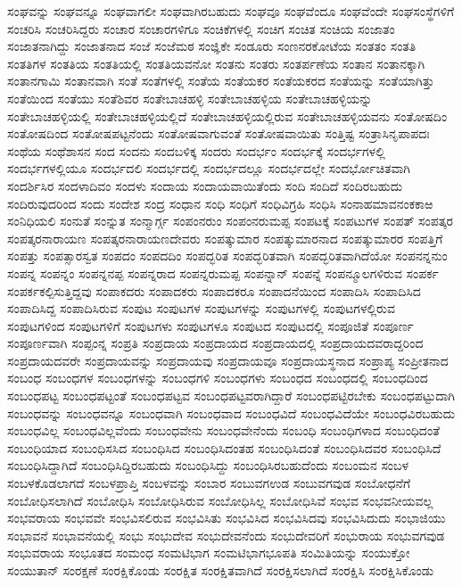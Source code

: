 {ಸಂಘವನ್ನು
ಸಂಘವನ್ನೂ
ಸಂಘವಾಗಲೀ
ಸಂಘವಾಗಿರಬಹುದು
ಸಂಘವೂ
ಸಂಘವೆಂದೂ
ಸಂಘವೆಂದೇ
ಸಂಘಸಂಸ್ಥೆಗಳಿಗೆ
ಸಂಚರಿಸಿ
ಸಂಚರಿಸಿದ್ದರು
ಸಂಚಾರ
ಸಂಚಾರಗಳಿಗೂ
ಸಂಚಿಕೆಗಳಲ್ಲಿ
ಸಂಚಿಗ
ಸಂಚಿತ
ಸಂಚಿಯ
ಸಂಜಾತಂ
ಸಂಜಾತನಾಗಿದ್ದು
ಸಂಜಾತನಾದ
ಸಂಜೆ
ಸಂಜೆಮಠ
ಸಂಜ್ಞಿಕೇ
ಸಂಡೂರು
ಸಂಣನರಕೋಟೆಯ
ಸಂತತಂ
ಸಂತತಿ
ಸಂತತಿಗಳ
ಸಂತತಿಯ
ಸಂತತಿಯಲ್ಲಿ
ಸಂತತಿಯವನೋ
ಸಂತನು
ಸಂತರು
ಸಂತರ್ಪಣೆಯ
ಸಂತಾನ
ಸಂತಾನಕ್ಕಾಗಿ
ಸಂತಾನಗಾಮಿ
ಸಂತಾನವಾಗಿ
ಸಂತೆ
ಸಂತೆಗಳಲ್ಲಿ
ಸಂತೆಯ
ಸಂತೆಯಕರ
ಸಂತೆಯಕರದ
ಸಂತೆಯನ್ನು
ಸಂತೆಯಾಗಿತ್ತು
ಸಂತೆಯಿಂದ
ಸಂತೆಯು
ಸಂತೆಶಿವರ
ಸಂತೇಬಾಚಹಳ್ಳಿ
ಸಂತೇಬಾಚಹಳ್ಳಿಯ
ಸಂತೇಬಾಚಹಳ್ಳಿಯನ್ನು
ಸಂತೇಬಾಚಹಳ್ಳಿಯಲ್ಲಿ
ಸಂತೇಬಾಚಹಳ್ಳಿಯಲ್ಲಿದೆ
ಸಂತೇಬಾಚಹಳ್ಳಿಯಲ್ಲಿರುವ
ಸಂತೇಬಾಚಹಳ್ಳಿಯವನು
ಸಂತೋಷದಿಂ
ಸಂತೋಷದಿಂದ
ಸಂತೋಷಪಟ್ಟನೆಂದು
ಸಂತೋಷವಾಗುವಂತೆ
ಸಂತೋಷವಾಯಿತು
ಸಂತ್ತಿಷ್ಟ
ಸಂತ್ರಾಸಿನೃಪಾಪದಃ
ಸಂಥೆಯ
ಸಂಥೆಶಾಸನ
ಸಂದ
ಸಂದನು
ಸಂದಬಳಿಕ್ಕ
ಸಂದರು
ಸಂದರ್ಭಂ
ಸಂದರ್ಭಕ್ಕೆ
ಸಂದರ್ಭಗಳಲ್ಲಿ
ಸಂದರ್ಭಗಳಲ್ಲಿಯೂ
ಸಂದರ್ಭದಲಿ
ಸಂದರ್ಭದಲ್ಲಿ
ಸಂದರ್ಭದಲ್ಲೂ
ಸಂದರ್ಭದಲ್ಲೇ
ಸಂದರ್ಭೋಚಿತವಾಗಿ
ಸಂದರ್ಶಿಸಿರ
ಸಂದಳಾದಿವಂ
ಸಂದಳು
ಸಂದಾಯ
ಸಂದಾಯವಾಯಿತೆಂದು
ಸಂದಿ
ಸಂದಿದೆ
ಸಂದಿರಬಹುದು
ಸಂದಿರುವುದರಿಂದ
ಸಂದು
ಸಂದೇಶ
ಸಂದ್ರ
ಸಂಧಾನ
ಸಂಧಿ
ಸಂಧಿಗೆ
ಸಂಧಿವಿಗ್ರಹಿ
ಸಂಧಿಸಿ
ಸಂನಾಹಮಾವನಂಕಕಾಱ
ಸಂನಿಧಿಯಲಿ
ಸಂನುತೆ
ಸಂನ್ನುತ
ಸಂನ್ಮಾರ್ಗ್ಗ
ಸಂಪಂನರುಂ
ಸಂಪಂನರುಮಪ್ಪ
ಸಂಪಟಕ್ಕೆ
ಸಂಪಟುಗಳ
ಸಂಪತ್
ಸಂಪತ್ಕರ
ಸಂಪತ್ಕರನಾರಾಯಣ
ಸಂಪತ್ಕರನಾರಾಯಣದೇವರು
ಸಂಪತ್ಕುಮಾರ
ಸಂಪತ್ಕುಮಾರನಾದ
ಸಂಪತ್ಕುಮಾರರ
ಸಂಪತ್ತಿಗೆ
ಸಂಪತ್ತು
ಸಂಪತ್ಸಾರಸ್ವತ
ಸಂಪದಂ
ಸಂಪದದಿಂ
ಸಂಪದ್ಭರಿತ
ಸಂಪದ್ಭರಿತವಾಗಿ
ಸಂಪದ್ಭರಿತವಾಗಿದೆಯೋ
ಸಂಪನನ್ನನುಂ
ಸಂಪನ್ನ
ಸಂಪನ್ನಂ
ಸಂಪನ್ನನಪ್ಪ
ಸಂಪನ್ನರಾದ
ಸಂಪನ್ನರುಮಪ್ಪ
ಸಂಪನ್ನಾನ್
ಸಂಪನ್ನೆ
ಸಂಪನ್ಮೂಲಗಳಿರುವ
ಸಂಪರ್ಕ
ಸಂಪರ್ಕಕಲ್ಪಿಸುತ್ತಿದ್ದವು
ಸಂಪಾಕದರು
ಸಂಪಾದಕರು
ಸಂಪಾದಕರೂ
ಸಂಪಾದನೆಯಿಂದ
ಸಂಪಾದಿಸಿ
ಸಂಪಾದಿಸಿದ
ಸಂಪಾದಿಸಿದ್ದ
ಸಂಪಾದಿಸಿರುವ
ಸಂಪುಟ
ಸಂಪುಟಗಳ
ಸಂಪುಟಗಳನ್ನು
ಸಂಪುಟಗಳಲ್ಲಿ
ಸಂಪುಟಗಳಲ್ಲಿರುವ
ಸಂಪುಟಗಳಿಂದ
ಸಂಪುಟಗಳಿಗೆ
ಸಂಪುಟಗಳು
ಸಂಪುಟಗಳೂ
ಸಂಪುಟದ
ಸಂಪುಟದಲ್ಲಿ
ಸಂಪೂಜಿತೆ
ಸಂಪೂರ್ಣ
ಸಂಪೂರ್ಣವಾಗಿ
ಸಂಪ್ಪಂನ್ನ
ಸಂಪ್ರತಿ
ಸಂಪ್ರದಾಯ
ಸಂಪ್ರದಾಯದ
ಸಂಪ್ರದಾಯದಲ್ಲಿ
ಸಂಪ್ರದಾಯದವರಾದ್ದರಿಂದ
ಸಂಪ್ರದಾಯದವರೇ
ಸಂಪ್ರದಾಯವನ್ನು
ಸಂಪ್ರದಾಯವು
ಸಂಪ್ರದಾಯವೂ
ಸಂಪ್ರದಾಯಸ್ಥನಾದ
ಸಂಪ್ರಾಪ್ಯ
ಸಂಪ್ರೀತನಾದ
ಸಂಬಂಧ
ಸಂಬಂಧಗಳ
ಸಂಬಂಧಗಳನ್ನು
ಸಂಬಂಧಗಳಿ
ಸಂಬಂಧಗಳು
ಸಂಬಂಧದ
ಸಂಬಂಧದಲ್ಲಿ
ಸಂಬಂಧದಿಂದ
ಸಂಬಂಧಪಟ್ಟ
ಸಂಬಂಧಪಟ್ಟಂತೆ
ಸಂಬಂಧಪಟ್ಟವ
ಸಂಬಂಧಪಟ್ಟವರಾಗಿದ್ದಾರೆ
ಸಂಬಂಧಪಟ್ಟಿರಬೇಕು
ಸಂಬಂಧಪಟ್ಟುದಾಗಿ
ಸಂಬಂಧವನ್ನು
ಸಂಬಂಧವನ್ನೂ
ಸಂಬಂಧವಾಗಿ
ಸಂಬಂಧವಾದ
ಸಂಬಂಧವಿದೆ
ಸಂಬಂಧವಿದೆಯೇ
ಸಂಬಂಧವಿರಬಹುದು
ಸಂಬಂಧವಿಲ್ಲ
ಸಂಬಂಧವಿಲ್ಲವೆಂದು
ಸಂಬಂಧವೇನು
ಸಂಬಂಧವೇನೆಂದು
ಸಂಬಂಧಿ
ಸಂಬಂಧಿಗಳಾದ
ಸಂಬಂಧಿದಂತೆ
ಸಂಬಂಧಿಯಾದ
ಸಂಬಂಧಿಸಸಿದ
ಸಂಬಂಧಿಸಿದ
ಸಂಬಂಧಿಸಿದಂತಹ
ಸಂಬಂಧಿಸಿದಂತೆ
ಸಂಬಂಧಿಸಿದವರ
ಸಂಬಂಧಿಸಿದೆ
ಸಂಬಂಧಿಸಿದ್ದಾಗಿದೆ
ಸಂಬಂಧಿಸಿದ್ದಿರಬಹುದು
ಸಂಬಂಧಿಸಿದ್ದು
ಸಂಬಂಧಿಸಿರಬಹುದೆಂದು
ಸಂಬಂಮನ
ಸಂಬಳ
ಸಂಬಳಕೊಡಲಾಗದೆ
ಸಂಬಳಪ್ರಾಪ್ತಿ
ಸಂಬಳವನ್ನು
ಸಂಬಾರ
ಸಂಬುವಗಉಡ
ಸಂಬುವಗವುಡ
ಸಂಬೋಧನೆಗೆ
ಸಂಬೋಧಿಸಲಾಗಿದೆ
ಸಂಬೋಧಿಸಿ
ಸಂಬೋಧಿಸಿರುವ
ಸಂಬೋಧಿಸಿಲ್ಲ
ಸಂಬೋಧಿಸಿವೆ
ಸಂಭವ
ಸಂಭವನೀಯವಲ್ಲ
ಸಂಭವರಾಯ
ಸಂಭವವೇ
ಸಂಭವಿಸಲಿರುವ
ಸಂಭವಿಸಿತು
ಸಂಭವಿಸಿದ
ಸಂಭವಿಸಿದವು
ಸಂಭವಿಸಿದುದು
ಸಂಭಾಜಿಯು
ಸಂಭಾವನೆ
ಸಂಭಾವನೆಯಲ್ಲಿ
ಸಂಭು
ಸಂಭುದೇವ
ಸಂಭುದೇವನೆಂದು
ಸಂಭುದೇವರಿಗೆ
ಸಂಭುರಾಯ
ಸಂಭುವಗವುಡ
ಸಂಭುವರಾಯ
ಸಂಭೂತದ
ಸಂಮಂಧ
ಸಂಮಟಿಭಾಗ
ಸಂಮಟಿಭಾಗಭೂಪತಿ
ಸಂಮಿತಿಯನ್ನು
ಸಂಯುಕ್ತೋ
ಸಂಯುತಾನ್
ಸಂರಕ್ಷಣೆ
ಸಂರಕ್ಷಿಕೊಂಡು
ಸಂರಕ್ಷಿತ
ಸಂರಕ್ಷಿತವಾಗಿದೆ
ಸಂರಕ್ಷಿಸಲಾಗಿದೆ
ಸಂರಕ್ಷಿಸಿ
ಸಂರಕ್ಷಿಸಿಕೊಂಡು
}
